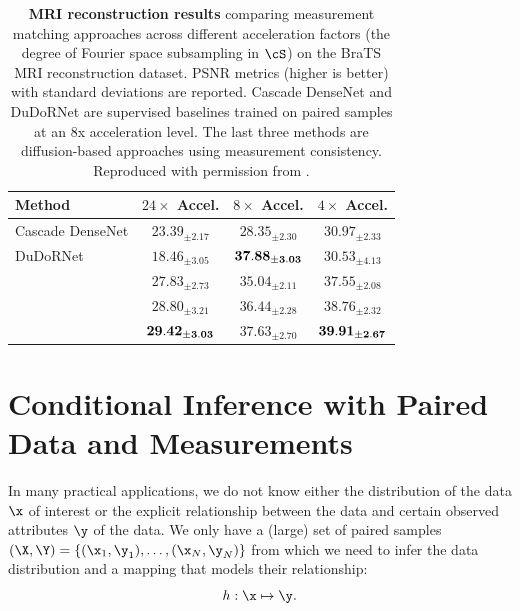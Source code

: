 \documentclass[../../book-main.tex]{subfiles}
\begin{document}
\begin{table}[t]
    \centering
    \begin{tabular}{@{}lccc@{}}
        \toprule
        Method & $24\times$ Accel. & $8\times$ Accel. & $4\times$ Accel. \\
        \midrule
        Cascade DenseNet & $23.39_{\pm 2.17}$ & $28.35_{\pm 2.30}$ & $30.97_{\pm 2.33}$ \\
        DuDoRNet & $18.46_{\pm 3.05}$ & $\bf 37.88_{\pm 3.03}$ & $30.53_{\pm 4.13}$ \\
        \textcite{song2020score} & $27.83_{\pm 2.73}$ & $35.04_{\pm 2.11}$ & $37.55_{\pm 2.08}$ \\
        \textcite{NEURIPS2021_7d6044e9} & $28.80_{\pm 3.21}$ & $36.44_{\pm 2.28}$ & $38.76_{\pm 2.32}$ \\
        \textcite{song2022solving} & $\bf 29.42_{\pm 3.03}$ & $37.63_{\pm 2.70}$ & $\bf 39.91_{\pm 2.67}$ \\
        \bottomrule
    \end{tabular}
    \caption{\textbf{MRI reconstruction results} comparing measurement matching
    approaches across different acceleration factors (the degree of Fourier
    space subsampling in $\cS$) on the BraTS MRI
    reconstruction dataset. PSNR metrics (higher is better) with
    standard deviations are reported.
    Cascade DenseNet
    \cite{NEURIPS2019_1e48c442} and DuDoRNet \cite{9156506} are supervised
    baselines trained on paired samples at an 8x acceleration level. The last
    three methods are diffusion-based approaches using measurement consistency.
    Reproduced with permission from \textcite{song2022solving}.}
    \label{tab:mri-reconstruction}
\end{table}

\section{Conditional Inference with Paired Data and Measurements}
In many practical applications, we do not know either the distribution of the data $\x$ of interest or the explicit relationship between the data and certain observed attributes $\y$ of the data. We only have  a (large) set of paired samples $(\X, \Y) = \{ (\x_1, \y_1), \ldots, (\x_N, \y_N) \}$ from which we need to infer the data distribution and a mapping that models their relationship:
\begin{equation}
  h: \x \mapsto \y.
\end{equation}
\end{document}
